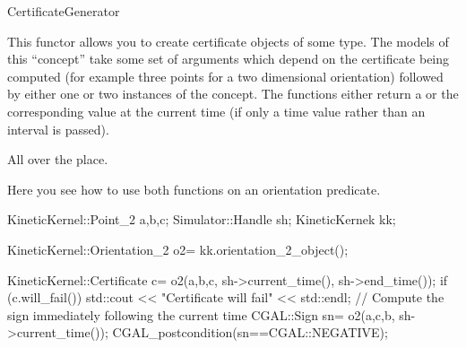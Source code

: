 
\begin{ccRefConcept}[Kinetic::]{CertificateGenerator}


\ccDefinition
  
This functor allows you to create certificate objects of some type.
The models of this ``concept'' take some set of arguments which depend
on the certificate being computed (for example three points for a two
dimensional orientation) followed by either one or two instances of
the  concept. The functions either
return a  or the corresponding value at the current
time (if only a time value rather than an interval is passed).




\ccOperations




\ccHasModels

All over the place.

\ccSeeAlso


\ccExample

Here you see how to use both functions on an orientation predicate.

\begin{ccExampleCode}
KineticKernel::Point_2 a,b,c;
Simulator::Handle sh;
KineticKernek kk;

KineticKernel::Orientation_2 o2= kk.orientation_2_object();

KineticKernel::Certificate c= o2(a,b,c, sh->current_time(), sh->end_time());
if (c.will_fail()) {
  std::cout << "Certificate will fail" << std::endl;
}
// Compute the sign immediately following the current time
CGAL::Sign sn= o2(a,c,b, sh->current_time());
CGAL_postcondition(sn==CGAL::NEGATIVE);

\end{ccExampleCode}


\end{ccRefConcept}



